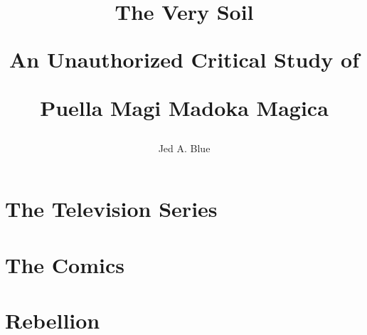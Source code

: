 \documentclass[12pt]{book}
\title{The Very Soil

An Unauthorized Critical Study of

Puella Magi Madoka Magica}
\author{Jed A. Blue}
\begin{document}
\maketitle
\newpage

\tableofcontents
\newpage

\frontmatter



\mainmatter
\part{The Television Series}













\part{The Comics}




\part{Rebellion}








\backmatter

\end{document}
